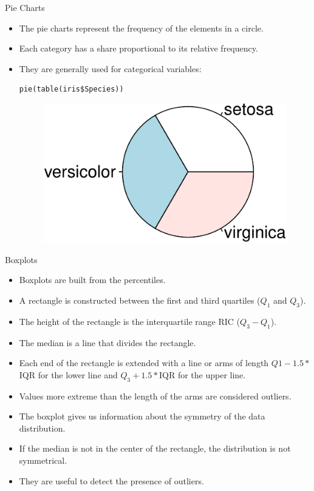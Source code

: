 \documentclass[handout]{beamer}
\begin{document}
\begin{frame}[fragile]{Pie Charts }
\scriptsize{
\begin{itemize}
 \item The pie charts represent the frequency of the elements in a circle.
 \item Each category has a share proportional to its relative frequency.
 \item They are generally used for categorical variables:
 \begin{verbatim}
pie(table(iris$Species))
 \end{verbatim}
 \begin{figure}[h!]
	\centering
	\includegraphics[scale=0.6]{pics/piechart.pdf}
	
	
\end{figure} 

\end{itemize}




}
\end{frame}


\begin{frame}[fragile]{Boxplots}
\scriptsize{
\begin{itemize}
 \item Boxplots are built from the percentiles. 
 \item A rectangle is constructed between the first and third quartiles ($Q_1$ and $Q_3$).
 \item The height of the rectangle is the interquartile range RIC ($Q_3 - Q_1$).
 \item The median is a line that divides the rectangle.
 \item Each end of the rectangle is extended with a line or arms of length $Q1-1.5*$IQR for the lower line and $Q_3+1.5*$IQR for the upper line.
 \item Values more extreme than the length of the arms are considered outliers.
 
 \item The boxplot gives us information about the symmetry of the data distribution.
  \item If the median is not in the center of the rectangle, the distribution is not symmetrical.
 \item They are useful to detect the presence of outliers.
 
\end{itemize}



}
\end{frame}
\end{document}
